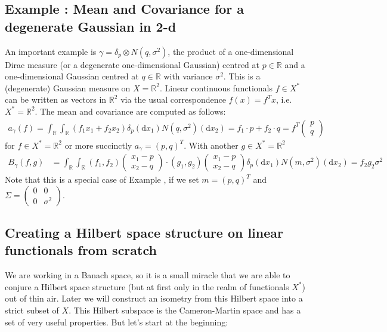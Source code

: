 \documentclass{scrartcl}
\theoremstyle{definition}
\theoremstyle{remark}
\newcommand{\de}{\mathrm d}
\newcommand{\R}{\mathbb R}
\newcommand*\circled[1]{\tikz[baseline=(char.base)]{
            \node[shape=circle,draw,inner sep=2pt] (char) {#1};}}
\DeclareRobustCommand{\myboxtwo}[2][blue!20]{%
\begin{tcolorbox}[   %
        breakable,
        left=0pt,
        right=0pt,
        top=0pt,
        bottom=0pt,
        colback=#1,
        colframe=#1,
        width=\dimexpr\textwidth\relax, 
        enlarge left by=0mm,
        boxsep=5pt,
        arc=10pt,outer arc=10pt,
        ]
        #2
\end{tcolorbox}
}
\begin{document}
\myboxtwo{
\subsection*{Example \circled{3}: Mean and Covariance for a degenerate Gaussian in 2-d}
An important example is $\gamma = \delta_p \otimes N(q, \sigma^2)$, the product of a one-dimensional Dirac measure (or a degenerate one-dimensional Gaussian) centred at $p\in\R$ and a one-dimensional Gaussian centred at $q\in\R$ with variance $\sigma^2$. This is a (degenerate) Gaussian measure on $X=\R^2$. Linear continuous functionals $f\in X^*$ can be written as vectors in $\R^2$ via the usual correspondence $f(x) = f^Tx$, i.e. $X^* = \R^2$. The mean and covariance are computed as follows:
\begin{align*}
a_\gamma(f) = \int_\R\int_\R (f_1x_1+f_2x_2) \delta_p(\de x_1) N(q, \sigma^2)(\de x_2) = f_1\cdot p + f_2\cdot q = f^T \begin{pmatrix}
p\\q
\end{pmatrix}
\end{align*}
for $f\in X^*=\R^2$ or more succinctly $a_\gamma = (p,q)^T$. With another $g\in X^*=\R^2$
\begin{align*}
B_\gamma(f,g) &= \int_\R\int_\R  (f_1,f_2)\begin{pmatrix}
x_1-p\\x_2-q
\end{pmatrix}\cdot (g_1,g_2)\begin{pmatrix}
x_1-p\\x_2-q
\end{pmatrix} \delta_p(\de x_1) N(m,\sigma^2)(\de x_2) = f_2g_2\sigma^2
\end{align*}
Note that this is a special case of Example \circled{1}, if we set $m = (p,q)^T$ and $\Sigma = \begin{pmatrix}
0&0\\0&\sigma^2
\end{pmatrix}$.
}
\subsection{Creating a Hilbert space structure on linear functionals from scratch}
We are working in a Banach space, so it is a small miracle that we are able to conjure a Hilbert space structure (but at first only in the realm of functionals $X^*$) out of thin air. Later we will construct an isometry from this Hilbert space into a strict subset of $X$. This Hilbert subspace is the Cameron-Martin space and has a set of very useful properties. But let's start at the beginning:
\end{document}
